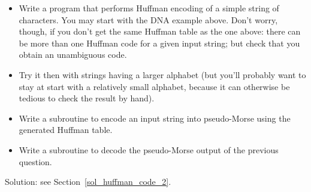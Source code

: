 \begin{exercise}
\label{huffman_code_2}
\begin{itemize}
\item Write a program that performs Huffman encoding of a simple string 
of characters. You may start with the DNA example above. Don't 
worry, though, if you don't get the same Huffman table as the one 
above: there can be more than one Huffman code for a given input 
string; but check that you obtain an unambiguous code. 
\item Try it 
then with strings having a larger alphabet (but you'll probably 
want to stay at start with a relatively small alphabet, because it can 
otherwise be tedious to check the result by hand).
\item Write a subroutine to encode an input string into 
pseudo-Morse using the generated Huffman table.
\item Write a subroutine to decode the pseudo-Morse output of 
the previous question.
\end{itemize}
%
Solution: see Section~\ref{sol_huffman_code_2}.
\end{exercise}

